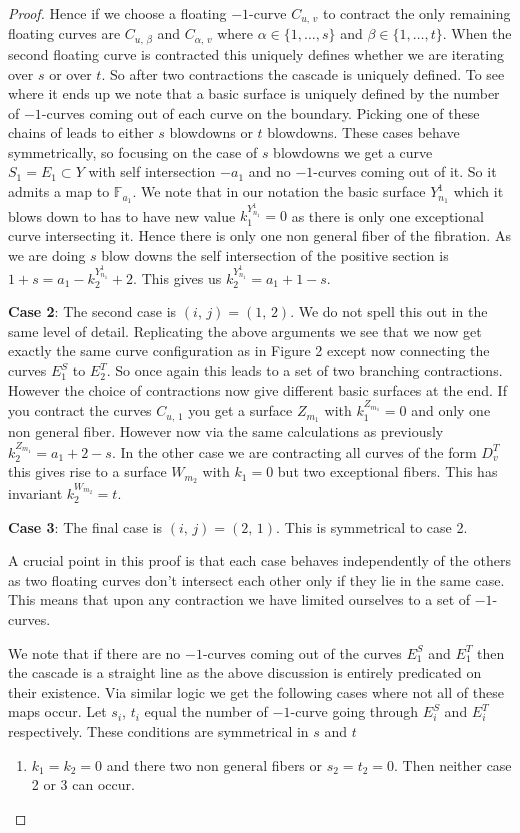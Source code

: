 \documentclass[12pt,a4paper]{book}      %
\theoremstyle{definition}
\newcommand{\mb}[1]{\mathbb{#1}}
\begin{document}
\begin{proof}
Hence if we choose a floating $-1$-curve $C_{u, \, v}$ to contract the only remaining floating curves are $C_{u, \, \beta}$ and $C_{\alpha , \, v}$ where $\alpha \in \{ 1, \dots, s\}$ and $\beta \in \{1 , \dots , t \}$. When the second floating curve is contracted this uniquely defines whether we are iterating over $s$ or over $t$. So after two contractions the cascade is uniquely defined. To see where it ends up we note that a basic surface is uniquely defined by the number of $-1$-curves coming out of each curve on the boundary. Picking one of these chains of  leads to either $s$ blowdowns or $t$ blowdowns. These cases behave symmetrically, so focusing on the case of $s$ blowdowns we get a curve $S_1 = E_1 \subset Y$ with self intersection $-a_1$ and no $-1$-curves coming out of it. So it admits a map to $\mb{F}_{a_1}$. We note that in our notation the basic surface $Y^1_{n_1}$ which it blows down to has to have new value $k^{Y^1_{n_1}}_1 = 0$ as there is only one exceptional curve intersecting it. Hence there is only one non general fiber of the fibration. As we are doing $s$ blow downs the self intersection of the positive section is $1 + s = a_1 - k^{Y^1_{n_1}}_2  + 2$. This gives us $k^{Y^1_{n_1}}_2  = a_1 + 1 - s$. 

\textbf{Case 2}: The second case is $(i, \, j) = (1, \, 2)$. We do not spell this out in the same level of detail. Replicating the above arguments we see that we now get exactly the same curve configuration as in Figure 2 except now connecting the curves $E_1^S$ to $E_2^T$. So once again this leads to a set of two branching contractions. However the choice of contractions now give different basic surfaces at the end. If you contract the curves $C_{u, \,1}$ you get a surface $Z_{m_1}$ with $k^{Z_{m_1}}_1 = 0$ and only one non general fiber. However now via the same calculations as previously $k^{Z_{m_1}}_2 = a_1 + 2 - s$. In the other case we are contracting all curves of the form $D^T_v$ this gives rise to a surface $W_{m_2}$ with $k_1 = 0$ but two exceptional fibers. This has invariant $k_2^{W_{m_2}} = t$. 

\textbf{Case 3}: The final case is $(i, \, j) = (2, \, 1)$. This is symmetrical to case 2.

A crucial point in this proof is that each case behaves independently of the others as two floating curves don't intersect each other only if they lie in the same case. This means that upon any contraction we have limited ourselves to a set of $-1$-curves.

We note that if there are no $-1$-curves coming out of the curves $E_1^S$ and $E_1^T$ then the cascade is a straight line as the above discussion is entirely predicated on their existence.
Via similar logic we get the following cases where not all of these maps occur. Let $s_i$, $t_i$ equal the number of $-1$-curve going through $E_i^S$ and $E_i^T$ respectively. These conditions are symmetrical in $s$ and $t$
\begin{enumerate}
\item $k_1 = k_2 = 0$ and there two non general fibers or $s_2 = t_2 = 0$. Then neither case 2 or 3 can occur.


\end{enumerate}
\end{proof}
\end{document}
